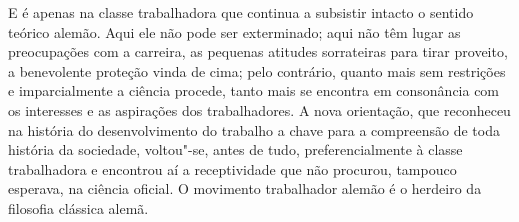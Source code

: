 E é apenas na classe trabalhadora que continua a subsistir intacto o
sentido teórico alemão. Aqui ele não pode ser exterminado; aqui não têm
lugar as preocupações com a carreira, as pequenas atitudes sorrateiras
para tirar proveito, a benevolente proteção vinda de cima; pelo
contrário, quanto mais sem restrições e 
imparcialmente a ciência procede, tanto mais se encontra em consonância
com os interesses e as aspirações dos trabalhadores. A nova orientação,
que reconheceu na história do desenvolvimento do trabalho a chave para a
compreensão de toda história da sociedade, voltou"-se, antes de tudo,
preferencialmente à classe trabalhadora e encontrou aí a receptividade
que não procurou, tampouco esperava, na ciência oficial. O movimento
trabalhador alemão é o herdeiro da filosofia clássica alemã.

\quebra

